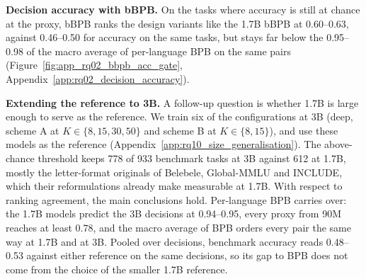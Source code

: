 \textbf{Decision accuracy with bBPB.}
On the tasks where accuracy is still at chance at the proxy, bBPB ranks the design variants like the 1.7B bBPB at 0.60--0.63, against 0.46--0.50 for accuracy on the same tasks, but stays far below the 0.95--0.98 of the macro average of per-language BPB on the same pairs (Figure~\ref{fig:app_rq02_bbpb_acc_gate}, Appendix~\ref{app:rq02_decision_accuracy}).



\textbf{Extending the reference to 3B.}
A follow-up question is whether 1.7B is large enough to serve as the reference. We train six of the configurations at 3B (deep, scheme A at $K \in \{8, 15, 30, 50\}$ and scheme B at $K \in \{8, 15\}$), and use these models as the reference (Appendix~\ref{app:rq10_size_generalisation}). The above-chance threshold keeps 778 of 933 benchmark tasks at 3B against 612 at 1.7B, mostly the letter-format originals of Belebele, Global-MMLU and INCLUDE, which their reformulations already make measurable at 1.7B. With respect to ranking agreement, the main conclusions hold. Per-language BPB carries over: the 1.7B models predict the 3B decisions at 0.94--0.95, every proxy from 90M reaches at least 0.78, and the macro average of BPB orders every pair the same way at 1.7B and at 3B. Pooled over decisions, benchmark accuracy reads 0.48--0.53 against either reference on the same decisions, so its gap to BPB does not come from the choice of the smaller 1.7B reference.


